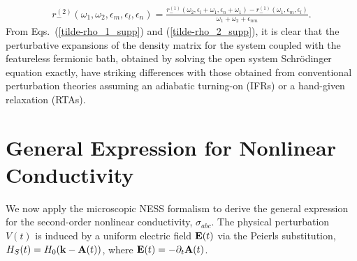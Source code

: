 \documentclass[twocolumn, prx, reprint, amsfonts, amsmath, amssymb, longbibliography, floatfix, aps]{revtex4-2}
\begin{document}
\begin{align}
r_-^{(2)}  (\omega_1, \omega_2, \epsilon_m, \epsilon_l, \epsilon_n) 
= \frac{ 
r_-^{(1)} (\omega_2, \epsilon_l+\omega_1, \epsilon_n+\omega_1)  
- r_-^{(1)} (\omega_1, \epsilon_m, \epsilon_l)  }
{\omega_1 + \omega_2 + \epsilon_{n m} }.
\label{tilde-rho_2_supp}
\end{align}
From Eqs.~(\ref{tilde-rho_1_supp}) and (\ref{tilde-rho_2_supp}), it is clear that the perturbative expansions of the density matrix for the system coupled with the featureless fermionic bath, obtained by solving the open system Schr\"{o}dinger equation exactly, have striking differences with those obtained from conventional perturbation theories assuming an adiabatic turning-on (IFRs) or a hand-given relaxation (RTAs).

\section{General Expression for Nonlinear Conductivity}
\label{S-B}

We now apply the microscopic NESS formalism to derive the general expression for the second-order nonlinear conductivity, $\sigma_{abc}$. The physical perturbation $V(t)$ is induced by a uniform electric field ${\bf E}(t)$ via the Peierls substitution, $H_S(t) = H_0({\bf k} - {\bf A}(t))$, where ${\bf E}(t) = -\partial_t {\bf A}(t)$.
\end{document}
